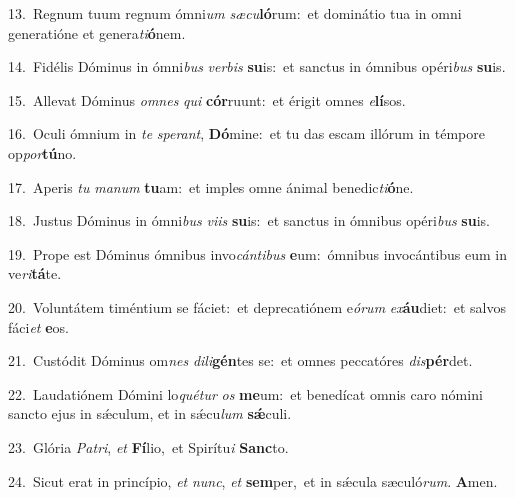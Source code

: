 {\numbfont\textcolor{\numbcolor}{13.}}~Regnum tuum regnum ómni\textit{um} \textit{sæ}\-\textit{cu}\textbf{ló}rum:~\star et dominátio tua in omni generatióne et genera\-\textit{ti}\-\textbf{ó}nem.\par
{\numbfont\textcolor{\numbcolor}{14.}}~Fidélis Dóminus in ómni\textit{bus} \textit{ver}\-\textit{bis} \textbf{su}\-is:~\star et sanctus in ómnibus opéri\textit{bus} \textbf{su}\-is.\par
{\numbfont\textcolor{\numbcolor}{15.}}~Allevat Dóminus \textit{om}\-\textit{nes} \textit{qui} \textbf{cór}\-ruunt:~\star et érigit omnes \textit{e}\-\textbf{lí}sos.\par
{\numbfont\textcolor{\numbcolor}{16.}}~Oculi ómnium in \textit{te} \textit{spe}\-\textit{rant}, \textbf{Dó}\-mine:~\star et tu das escam illórum in témpore op\-\textit{por}\-\textbf{tú}no.\par
{\numbfont\textcolor{\numbcolor}{17.}}~Aperis \textit{tu} \textit{ma}\-\textit{num} \textbf{tu}\-am:~\star et imples omne ánimal benedic\-\textit{ti}\-\textbf{ó}ne.\par
{\numbfont\textcolor{\numbcolor}{18.}}~Justus Dóminus in ómni\textit{bus} \textit{vi}\-\textit{is} \textbf{su}\-is:~\star et sanctus in ómnibus opéri\textit{bus} \textbf{su}\-is.\par
{\numbfont\textcolor{\numbcolor}{19.}}~Prope est Dóminus ómnibus invo\-\textit{cán}\-\textit{ti}\textit{bus} \textbf{e}\-um:~\star ómnibus invocántibus eum in ve\-\textit{ri}\-\textbf{tá}te.\par
{\numbfont\textcolor{\numbcolor}{20.}}~Voluntátem timéntium se fáciet:~\dagger et deprecatiónem e\-\textit{ó}\-\textit{rum} \textit{ex}\-\textbf{áu}diet:~\star et salvos fáci\textit{et} \textbf{e}\-os.\par
{\numbfont\textcolor{\numbcolor}{21.}}~Custódit Dóminus om\textit{nes} \textit{di}\-\textit{li}\textbf{gén}tes se:~\star et omnes peccatóres \textit{dis}\-\textbf{pér}det.\par
{\numbfont\textcolor{\numbcolor}{22.}}~Laudatiónem Dómini lo\-\textit{qué}\-\textit{tur} \textit{os} \textbf{me}\-um:~\star et benedícat omnis caro nómini sancto ejus in sǽculum, et in sǽcu\textit{lum} \textbf{sǽ}\-culi.\par
{\numbfont\textcolor{\numbcolor}{23.}}~Glória \textit{Pa}\-\textit{tri}, \textit{et} \textbf{Fí}\-lio,~\star et Spirítu\textit{i} \textbf{Sanc}\-to.\par
{\numbfont\textcolor{\numbcolor}{24.}}~Sicut erat in princípio, \textit{et} \textit{nunc}\-, \textit{et} \textbf{sem}\-per,~\star et in sǽcula sæculó\-\textit{rum}\-. \textbf{A}\-men.\par
